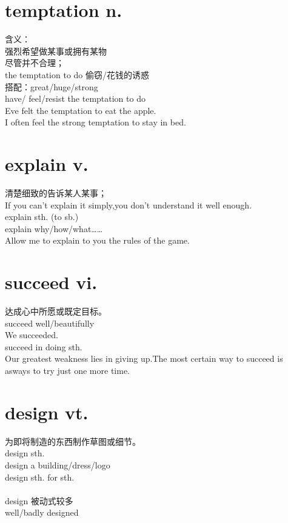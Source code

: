 \documentclass[twocolumn]{ctexbook}
\newcommand{\point}[1]{{\color{red}#1}}
\newcommand{\word}[1]{{\em\color{black}{#1}}}
\begin{document}
        \section{temptation n.}
        含义：\\
        强烈希望做某事或拥有某物\\
        \point{尽管并不合理；}\\
        the temptation to do  偷窃/花钱的诱惑\\
        搭配：great/huge/strong \word{temptation}\\
       have/ feel/resist the temptation to do \\
        Eve felt the temptation to eat the apple.\\
        I often feel the strong temptation to stay in bed.\\
        \section{explain v.}
        \point{清楚细致}的告诉某人某事；\\
        If you can't explain it simply,you don't understand it well enough.\\
        explain sth. (to sb.)\\
        explain why/how/what……\\
        Allow me to explain to you the rules of the game.\\
        \section{succeed vi.}
        达成心中所愿或既定目标。\\
        succeed well/beautifully\\
        We succeeded.\\
        succeed in doing sth.\\
        Our greatest weakness lies in giving up.The most certain way
        to succeed is asways to try just one more time.\\
        \section{design vt.}
        为即将制造的东西制作草图或细节。\\
        design sth.\\
        design a building/dress/logo\\
        design sth. for sth.\\
        \word{architect n.[C ]}\\
        design 被动式较多\\
        well/badly designed\\
\end{document}
